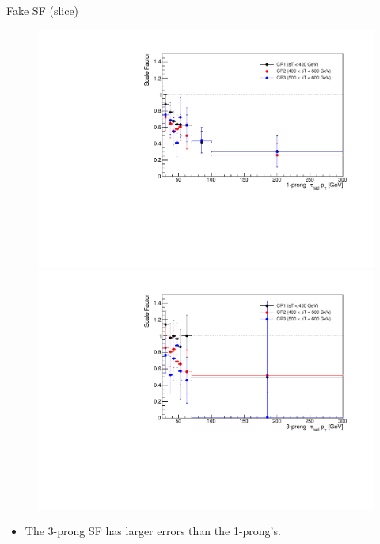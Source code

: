 \documentclass[aspectratio=46, dvipdfmx, 10pt, t]{beamer} %
\begin{document}
\begin{frame}{Fake SF (\sT slice)}\label{fake_sf_cr1_cr2_c3}
  \vspace{5mm}
  \begin{figure}
    \setcounter{subfigure}{0}
    \centering
        \includegraphics[scale=0.29]{scale_factor_controlregions_1P_notrigger}
        \includegraphics[scale=0.29]{scale_factor_controlregions_3P_notrigger}
  \end{figure}

  \begin{itemize}
    \item The 3-prong SF has larger errors than the 1-prong's.
  \end{itemize}
\end{frame}
\end{document}
